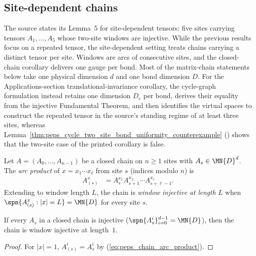 \subsection{Site-dependent chains}

The source states its Lemma~5 for site-dependent tensors: five sites
carrying tensors $A_1, \ldots, A_5$ whose two-site windows are injective.
While the previous results focus on a repeated tensor, the site-dependent setting
treats chains carrying a distinct tensor per site. Windows are arcs of consecutive sites,
and the closed-chain corollary delivers one gauge per bond. Most of the
matrix-chain statements below take one physical dimension $d$ and one bond
dimension $D$. For the Applications-section translational-invariance
corollary, the cycle-graph formulation instead retains one dimension $D_e$ per
bond, derives their equality from the injective Fundamental Theorem, and then
identifies the virtual spaces to construct the repeated tensor in the source's
standing regime of at least three sites, whereas Lemma~\ref{thm:peps_cycle_two_site_bond_uniformity_counterexample}
(\cite{gap:peps_cyclic_mps_two_site_bond_uniformity}) shows that the two-site case of the printed corollary is false.

\begin{definition}%
    \label{def:chain_arc_window_injective}
    \leanok
    Let $A=(A_0, \ldots, A_{n-1})$ be a closed chain on $n \ge 1$ sites with
    $A_s\in\MN{D}^d$. The \emph{arc product} of $x=x_1\cdots x_\ell$ from site
    $s$ (indices modulo $n$) is
    \begin{align}
        A_{(s)}^{x}
         & =A_s^{x_1}A_{s+1}^{x_2}\cdots A_{s+\ell-1}^{x_\ell}.
        \label{eq:peps_chain_arc_product}
    \end{align}
    Extending \cite[Section~``Normal MPS: alternative proof'']{Molnar2018NormalPEPS}
    to window length $L$, the chain is \emph{window injective at length $L$}
    when $\spn\{A_{(s)}^x:|x|=L\}=\MN{D}$ for every site $s$.
\end{definition}

\begin{lemma}%
    \label{lem:isWindowInjective_one_of_isInjective}
    \leanok
    If every $A_s$ in a closed chain is injective
    ($\spn\{A_s^i\}_{i=0}^{d-1}=\MN{D}$), then the chain is window injective
    at length~$1$.
\end{lemma}
\begin{proof}\leanok
    For $|x|=1$, $A_{(s)}^{i}=A_s^i$ by (\ref{eq:peps_chain_arc_product}).
\end{proof}

